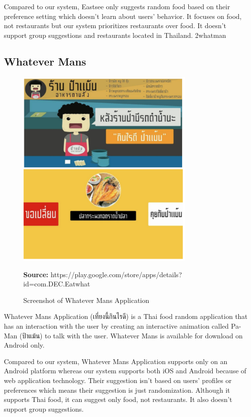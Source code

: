 \documentclass[12pt,oneside,openright,a4paper]{cpe-english-project}
\newcommand*{\captionsource}[2]{%
  \caption[{#1}]{#1}\vspace{-8pt}
  \textbf{Source:} #2}
\begin{document}
Compared to our system, Eastsee only suggests random food based on their preference setting which doesn’t learn about users’ behavior. It focuses on food, not restaurants but our system prioritizes restaurants over food. It doesn’t support group suggestions and restaurants located in Thailand.
2whatman

\newpage
\subsection{Whatever Mans}

\begin{figure}[H]\centering
\includegraphics[width=250pt]{./images/2whatman.png}
\label{fig:2whatman}
\captionsource{Screenshot of Whatever Mans Application}{https://play.google.com/store/apps/details?id=com.DEC.Eatwhat}
\end{figure}\vspace{-24pt}
\vspace{1em}

Whatever Mans Application  ({\thaifont เที่ยงนี้กินไรดี}) is a Thai food random application that has an interaction with the user by creating an interactive animation called Pa-Man ({\thaifont ป้าแม้น}) to talk with the user. \cite{Whatevermans} Whatever Mans is available for download on Android only.

Compared to our system, Whatever Mans Application supports only on an Android platform whereas our system supports both iOS and Android because of web application technology. Their suggestion isn't based on users’ profiles or preferences which means their suggestion is just randomization. Although it supports Thai food, it can suggest only food, not restaurants. It also doesn’t support group suggestions.
\end{document}

